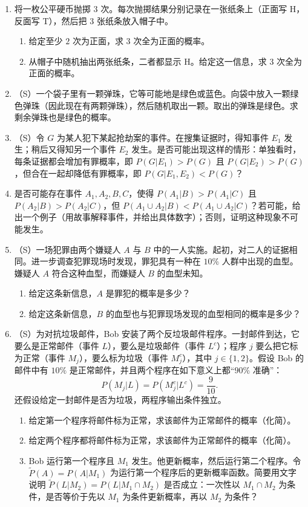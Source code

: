 \documentclass[UTF8,12pt,a4paper,fontset=fandol]{ctexart}
\begin{document}
\begin{enumerate}
  \item 将一枚公平硬币抛掷 $3$ 次。每次抛掷结果分别记录在一张纸条上（正面写 H，反面写 T），然后把 $3$ 张纸条放入帽子中。
  \begin{enumerate}
    \item 给定至少 $2$ 次为正面，求 $3$ 次全为正面的概率。
    \item 从帽子中随机抽出两张纸条，二者都显示 H。给定这一信息，求 $3$ 次全为正面的概率。
  \end{enumerate}

  \item （S）一个袋子里有一颗弹珠，它等可能地是绿色或蓝色。向袋中放入一颗绿色弹珠（因此现在有两颗弹珠），然后随机取出一颗。取出的弹珠是绿色。求剩余弹珠也是绿色的概率。

  \item （S）令 $G$ 为某人犯下某起抢劫案的事件。在搜集证据时，得知事件 $E_1$ 发生；稍后又得知另一个事件 $E_2$ 发生。是否可能出现这样的情形：单独看时，每条证据都会增加有罪概率，即 $P(G|E_1)>P(G)$ 且 $P(G|E_2)>P(G)$，但合在一起却降低有罪概率，即 $P(G|E_1,E_2)<P(G)$？

  \item 是否可能存在事件 $A_1,A_2,B,C$，使得 $P(A_1|B)>P(A_1|C)$ 且 $P(A_2|B)>P(A_2|C)$，但 $P(A_1\cup A_2|B)<P(A_1\cup A_2|C)$？若可能，给出一个例子（用故事解释事件，并给出具体数字）；否则，证明这种现象不可能发生。

  \item （S）一场犯罪由两个嫌疑人 $A$ 与 $B$ 中的一人实施。起初，对二人的证据相同。进一步调查犯罪现场时发现，罪犯具有一种在 $10\%$ 人群中出现的血型。嫌疑人 $A$ 符合这种血型，而嫌疑人 $B$ 的血型未知。
  \begin{enumerate}
    \item 给定这条新信息，$A$ 是罪犯的概率是多少？
    \item 给定这条新信息，$B$ 的血型也与犯罪现场发现的血型相同的概率是多少？
  \end{enumerate}

  \item （S）为对抗垃圾邮件，Bob 安装了两个反垃圾邮件程序。一封邮件到达，它要么是正常邮件（事件 $L$），要么是垃圾邮件（事件 $L^c$）；程序 $j$ 要么把它标为正常（事件 $M_j$），要么标为垃圾（事件 $M_j^c$），其中 $j\in\{1,2\}$。假设 Bob 的邮件中有 $10\%$ 是正常邮件，并且两个程序在如下意义上都“$90\%$ 准确”：
  \[
    P(M_j|L)=P(M_j^c|L^c)=\frac9{10}.
  \]
  还假设给定一封邮件是否为垃圾，两程序输出条件独立。
  \begin{enumerate}
    \item 给定第一个程序将邮件标为正常，求该邮件为正常邮件的概率（化简）。
    \item 给定两个程序都将邮件标为正常，求该邮件为正常邮件的概率（化简）。
    \item Bob 运行第一个程序且 $M_1$ 发生。他更新概率，然后运行第二个程序。令 $\widetilde P(A)=P(A|M_1)$ 为运行第一个程序后的更新概率函数。简要用文字说明 $\widetilde P(L|M_2)=P(L|M_1\cap M_2)$ 是否成立：一次性以 $M_1\cap M_2$ 为条件，是否等价于先以 $M_1$ 为条件更新概率，再以 $M_2$ 为条件？
  \end{enumerate}


\end{enumerate}
\end{document}
